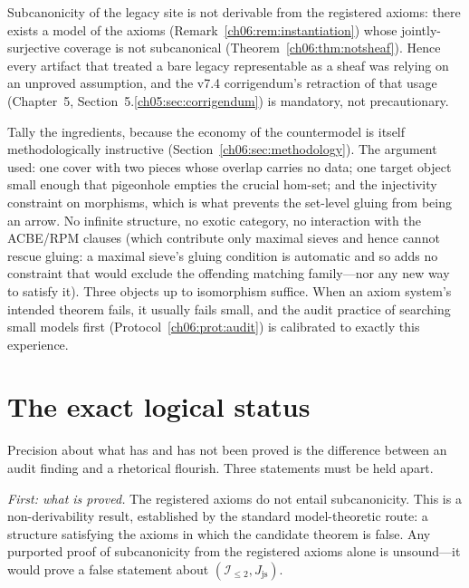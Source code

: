 \begin{corollary}\label{ch06:cor:nonderivable}
Subcanonicity of the legacy site is not derivable from the registered
axioms: there exists a model of the axioms
(Remark~\ref{ch06:rem:instantiation}) whose jointly-surjective coverage is
not subcanonical (Theorem~\ref{ch06:thm:notsheaf}). Hence every artifact
that treated a bare legacy representable as a sheaf was relying on an
unproved assumption, and the v7.4 corrigendum's retraction of that usage
(Chapter~5, Section~5.\ref{ch05:sec:corrigendum}) is mandatory, not
precautionary.
\end{corollary}

\begin{remark}\label{ch06:rem:minimal}
Tally the ingredients, because the economy of the
countermodel is itself methodologically instructive
(Section~\ref{ch06:sec:methodology}). The argument used: one cover with two
pieces whose overlap carries no data; one target object small enough that
pigeonhole empties the crucial hom-set; and the injectivity constraint on
morphisms, which is what prevents the set-level gluing from being an arrow.
No infinite structure, no exotic category, no interaction with the ACBE/RPM
clauses (which contribute only maximal sieves and hence cannot rescue
gluing: a maximal sieve's gluing condition is automatic and so adds no
constraint that would exclude the offending matching family---nor any new
way to satisfy it). Three objects up to isomorphism suffice. When an
axiom system's intended theorem fails, it usually fails small, and the
audit practice of searching small models first
(Protocol~\ref{ch06:prot:audit}) is calibrated to exactly this experience.
\end{remark}

\section{The exact logical status}\label{ch06:sec:status}

Precision about what has and has not been proved is the difference between
an audit finding and a rhetorical flourish. Three statements must be held
apart.

\emph{First: what is proved.} The registered axioms do not entail
subcanonicity. This is a non-derivability result, established by the
standard model-theoretic route: a structure satisfying the axioms in which
the candidate theorem is false. Any purported proof of subcanonicity from
the registered axioms alone is unsound---it would prove a false statement
about $(\mathcal{I}_{\le 2},J_{\mathrm{js}})$.

